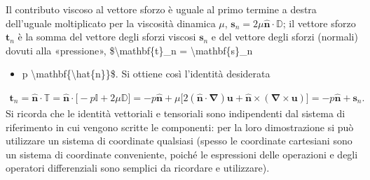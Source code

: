\documentclass[letterpaper,10pt,italian]{jupyterBook}
\begin{document}
\sphinxAtStartPar
Il contributo viscoso al vettore sforzo è uguale al
primo termine a destra dell’uguale moltiplicato per la viscosità
dinamica \(\mu\), \(\mathbf{s}_n = 
 2 \mu \mathbf{\hat{n}} \cdot \mathbb{D}\); il vettore sforzo \(\mathbf{t}_n\) è la
somma del vettore degli sforzi viscosi \(\mathbf{s}_n\) e del vettore degli
sforzi (normali) dovuti alla «pressione», \$\textbackslash{}mathbf\{t\}\_n = \textbackslash{}mathbf\{s\}\_n
\begin{itemize}
\item {} 
\sphinxAtStartPar
p \textbackslash{}mathbf\{\textbackslash{}hat\{n\}\}\$. Si ottiene così l’identità desiderata

\end{itemize}
\begin{equation*}
\begin{split}\label{eqn:stress_tensor-3}
 \mathbf{t}_n = \mathbf{\hat{n}} \cdot \mathbb{T} =
  \mathbf{\hat{n}} \cdot \big[-p\mathbb{I} + 2\mu\mathbb{D} \big] = 
  -p \mathbf{\hat{n}} +
 \mu \big[2 (\mathbf{\hat{n}} \cdot \mathbf{\nabla}) \mathbf{u} +
  \mathbf{\hat{n}} \times (\mathbf{\nabla} \times \mathbf{u}) \big] = 
  - p\mathbf{\hat{n}} + \mathbf{s}_n.\end{split}
\end{equation*}
\sphinxAtStartPar
Si ricorda che le identità vettoriali e tensoriali sono indipendenti dal
sistema di riferimento in cui vengono scritte le componenti: per la loro
dimostrazione si può utilizzare un sistema di coordinate qualsiasi
(spesso le coordinate cartesiani sono un sistema di coordinate
conveniente, poiché le espressioni delle operazioni e degli operatori
differenziali sono semplici da ricordare e utilizzare).
\end{document}

